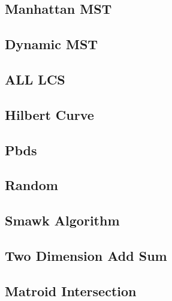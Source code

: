 \subsection{Manhattan MST}

\subsection{Dynamic MST}

\subsection{ALL LCS}

\subsection{Hilbert Curve}

\subsection{Pbds}

\subsection{Random}

\subsection{Smawk Algorithm}

\subsection{Two Dimension Add Sum}

\subsection{Matroid Intersection}
